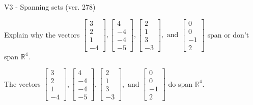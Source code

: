 \begin{exercise}
  \begin{exerciseTitle}V3 - Spanning sets (ver. 278)\end{exerciseTitle}
  \begin{exerciseStatement}
    Explain why the vectors \(\left[\begin{array}{r}
3 \\
2 \\
1 \\
-4
\end{array}\right] , \left[\begin{array}{r}
4 \\
-4 \\
-4 \\
-5
\end{array}\right] , \left[\begin{array}{r}
2 \\
1 \\
3 \\
-3
\end{array}\right] , \text{ and } \left[\begin{array}{r}
0 \\
0 \\
-1 \\
2
\end{array}\right]\) span or don't span \(\mathbb{R}^4\). 
	


  \end{exerciseStatement}
  \begin{exerciseAnswer}
   The vectors \(\left[\begin{array}{r}
3 \\
2 \\
1 \\
-4
\end{array}\right] , \left[\begin{array}{r}
4 \\
-4 \\
-4 \\
-5
\end{array}\right] , \left[\begin{array}{r}
2 \\
1 \\
3 \\
-3
\end{array}\right] , \text{ and } \left[\begin{array}{r}
0 \\
0 \\
-1 \\
2
\end{array}\right]\) 
  	 do  
	span \(\mathbb{R}^4\).
  


  \end{exerciseAnswer}
\end{exercise}